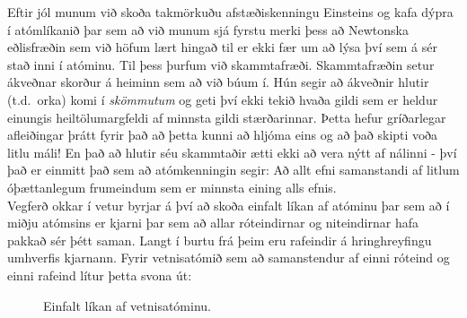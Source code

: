 \ifdefined \wholebook \else\documentclass[oneside]{book}\usepackage{EdlBook}\graphicspath{{figures/}}
\begin{document}
Eftir jól munum við skoða takmörkuðu afstæðiskenningu Einsteins og kafa dýpra í atómlíkanið þar sem að við munum sjá fyrstu merki þess að Newtonska eðlisfræðin sem við höfum lært hingað til er ekki fær um að lýsa því sem á sér stað inni í atóminu. Til þess þurfum við skammtafræði. Skammtafræðin setur ákveðnar skorður á heiminn sem að við búum í. Hún segir að ákveðnir hlutir (t.d.~orka) komi í \emph{skömmutum} og geti því ekki tekið hvaða gildi sem er heldur einungis heiltölumargfeldi af minnsta gildi stærðarinnar. Þetta hefur gríðarlegar afleiðingar þrátt fyrir það að þetta kunni að hljóma eins og að það skipti voða litlu máli! En það að hlutir séu skammtaðir ætti ekki að vera nýtt af nálinni - því það er einmitt það sem að atómkenningin segir: Að allt efni samanstandi af litlum óþættanlegum frumeindum sem er minnsta eining alls efnis. \\



Vegferð okkar í vetur byrjar á því að skoða einfalt líkan af atóminu þar sem að í miðju atómsins er kjarni þar sem að allar róteindirnar og niteindirnar hafa pakkað sér þétt saman. Langt í burtu frá þeim eru rafeindir á hringhreyfingu umhverfis kjarnann. Fyrir vetnisatómið sem að samanstendur af einni róteind og einni rafeind lítur þetta svona út:


\begin{figure}[H]
    \centering
    \caption{Einfalt líkan af vetnisatóminu.}
\end{figure}
\end{document}

